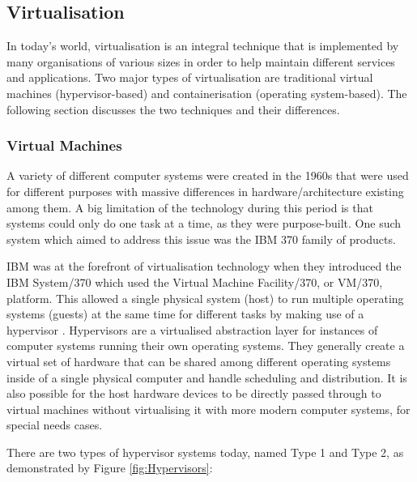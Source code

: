 
\subsection{Virtualisation}
In today's world, virtualisation is an integral technique that is implemented by many organisations of various sizes in order to help maintain different services and applications. Two major types of virtualisation are traditional virtual machines (hypervisor-based) and containerisation (operating system-based). The following section discusses the two techniques and their differences.

\subsubsection{Virtual Machines}
 
A variety of different computer systems were created in the 1960s that were used for different purposes with massive differences in hardware/architecture existing among them. A big limitation of the technology during this period is that systems could only do one task at a time, as they were purpose-built. One such system which aimed to address this issue was the IBM 370 family of products.

IBM was at the forefront of virtualisation technology when they introduced the IBM System/370 which used the Virtual Machine Facility/370, or VM/370, platform. This allowed a single physical system (host) to run multiple operating systems (guests) at the same time for different tasks by making use of a hypervisor \parencite{creasy1981origin}. Hypervisors are a virtualised abstraction layer for instances of computer systems running their own operating systems. They generally create a virtual set of hardware that can be shared among different operating systems inside of a single physical computer and handle scheduling and distribution. It is also possible for the host hardware devices to be directly passed through to virtual machines without virtualising it with more modern computer systems, for special needs cases.

There are two types of hypervisor systems today, named Type 1 and Type 2, as demonstrated by Figure \ref{fig:Hypervisors}:

